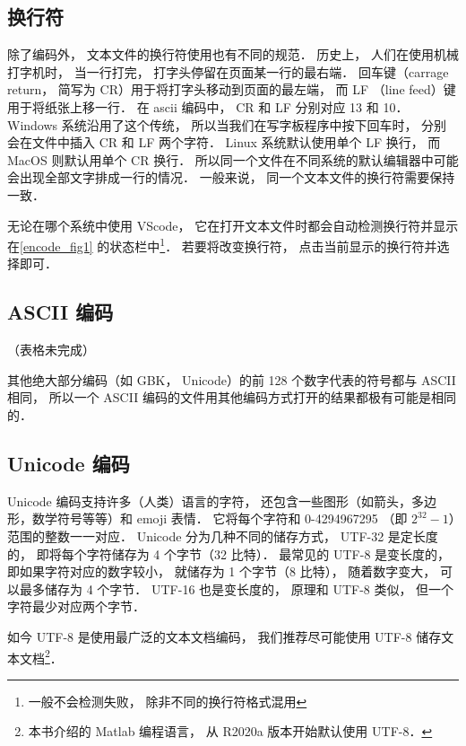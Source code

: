 \subsection{换行符}
除了编码外， 文本文件的换行符使用也有不同的规范． 历史上， 人们在使用机械打字机时， 当一行打完， 打字头停留在页面某一行的最右端． 回车键（carrage return， 简写为 CR）用于将打字头移动到页面的最左端， 而 LF （line feed）键用于将纸张上移一行． 在 ascii 编码中， CR 和 LF 分别对应 13 和 10． Windows 系统沿用了这个传统， 所以当我们在写字板程序中按下回车时， 分别会在文件中插入 CR 和 LF 两个字符． Linux 系统默认使用单个 LF 换行， 而 MacOS 则默认用单个 CR 换行． 所以同一个文件在不同系统的默认编辑器中可能会出现全部文字排成一行的情况． 一般来说， 同一个文本文件的换行符需要保持一致．

无论在哪个系统中使用 VScode， 它在打开文本文件时都会自动检测换行符并显示在\autoref{encode_fig1} 的状态栏中\footnote{一般不会检测失败， 除非不同的换行符格式混用}． 若要将改变换行符， 点击当前显示的换行符并选择即可．

\subsection{ASCII 编码}
（表格未完成）

其他绝大部分编码（如 GBK， Unicode）的前 128 个数字代表的符号都与 ASCII 相同， 所以一个 ASCII 编码的文件用其他编码方式打开的结果都极有可能是相同的．

\subsection{Unicode 编码}
Unicode 编码支持许多（人类）语言的字符， 还包含一些图形（如箭头，多边形，数学符号等等）和 emoji 表情． 它将每个字符和 0-4294967295 （即 $2^{32}-1$）范围的整数一一对应． Unicode 分为几种不同的储存方式， UTF-32 是定长度的， 即将每个字符储存为 4 个字节（32 比特）． 最常见的 UTF-8 是变长度的， 即如果字符对应的数字较小， 就储存为 1 个字节（8 比特）， 随着数字变大， 可以最多储存为 4 个字节． UTF-16 也是变长度的， 原理和 UTF-8 类似， 但一个字符最少对应两个字节．

如今 UTF-8 是使用最广泛的文本文档编码， 我们推荐尽可能使用 UTF-8 储存文本文档\footnote{本书介绍的 Matlab 编程语言， 从 R2020a 版本开始默认使用 UTF-8．}．
